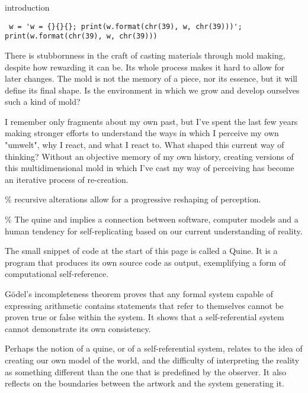 
\begin{center}
\vspace*{\fill}
\Huge introduction

\vspace{2cm}

\begin{flushright}
\footnotesize 
\begin{verbatim}
 w = 'w = {}{}{}; print(w.format(chr(39), w, chr(39)))'; print(w.format(chr(39), w, chr(39)))
\end{verbatim} 
\end{flushright}
\vspace*{\fill}
\end{center}

\normalsize


There is stubbornness in the craft of casting materials through mold making, despite how rewarding it can be. Its whole process makes it hard to allow for later changes. The mold is not the memory of a piece, nor its essence, but it will define its final shape. Is the environment in which we grow and develop ourselves such a kind of mold? 

I remember only fragments about my own past, but I’ve spent the last few years making stronger efforts to understand the ways in which I perceive my own "umwelt", why I react, and what I react to.  What shaped this current way of thinking? Without an objective memory of my own history, creating versions of this multidimensional mold in which I’ve cast my way of perceiving has become an iterative process of re-creation.


{\scriptsize \textcolor{comment}{\% recursive alterations allow for a progressive reshaping of perception. }}

{\scriptsize \textcolor{comment}{\% The quine and implies a connection between software, computer models and a human tendency for self-replicating based on our current understanding of reality.}}

The small snippet of code at the start of this page is called a Quine. It is a program that produces its own source code as output, exemplifying a form of computational self-reference. 

Gödel’s incompleteness theorem proves that any formal system capable of expressing arithmetic contains statements that refer to themselves cannot be proven true or false within the system. It shows that a self-referential system cannot demonstrate its own consistency.

Perhaps the notion of a quine, or of a self-referential system, relates to the idea of creating our own model of the world, and the difficulty of interpreting the reality as something different than the one that is predefined by the observer. It also reflects on the boundaries between the artwork and the system generating it.

